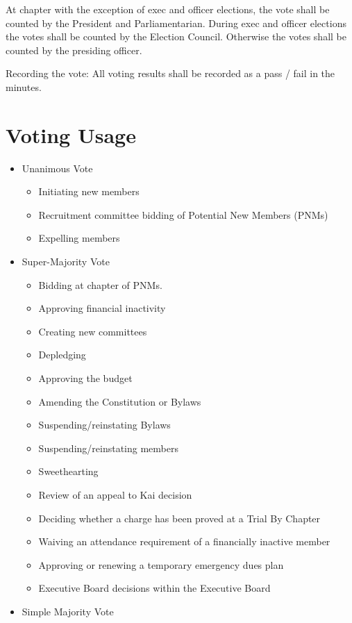 At chapter with the exception of exec and officer elections, the vote shall be
counted by the President and Parliamentarian.
During exec and officer elections the votes shall be counted by the Election
Council.
Otherwise the votes shall be counted by the presiding officer.

Recording the vote: All voting results shall be recorded as a pass / fail in the
minutes.

\section{Voting Usage}
\label{sec:voting-usage}

\begin{itemize}
	\item[] Unanimous Vote
		\begin{itemize}
			\item Initiating new members
			\item Recruitment committee bidding of Potential New Members (PNMs)
			\item Expelling members
		\end{itemize}
	\item[] Super-Majority Vote
		\begin{itemize}
			\item Bidding at chapter of PNMs.
			\item Approving financial inactivity
			\item Creating new committees
			\item Depledging
			\item Approving the budget
			\item Amending the Constitution or Bylaws
			\item Suspending/reinstating Bylaws
			\item Suspending/reinstating members
			\item Sweethearting
			\item Review of an appeal to Kai decision
			\item Deciding whether a charge has been proved at a Trial By
				Chapter
			\item Waiving an attendance requirement of a financially inactive
				member
			\item Approving or renewing a temporary emergency dues plan
			\item Executive Board decisions within the Executive Board
		\end{itemize}
	\item[] Simple Majority Vote

\end{itemize}
